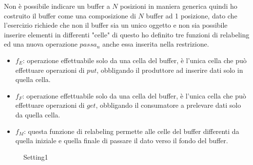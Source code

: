 \documentclass[a4paper]{article}
\begin{document}
Non è possibile indicare un buffer a $N$ posizioni in maniera generica quindi ho costruito il buffer come una composizione di $N$ buffer ad 1 posizione, dato che l'esercizio richiede che non il buffer sia un unico oggetto e non sia possibile inserire elementi in differenti "celle" di questo ho definito tre funzioni di relabeling ed una nuova operazione $passa_n$ anche essa inserita nella restrizione.
\begin{itemize}
	\item $f_E$: operazione effettuabile solo da una cella del buffer, è l'unica cella che può effettuare operazioni di $put$, obbligando il produttore ad inserire dati solo in quella cella.
	\item $f_F$: operazione effettuabile solo da una cella del buffer, è l'unica cella che può effettuare operazioni di $get$, obbligando il consumatore a prelevare dati solo da quella cella.
	\item $f_M$: questa funzione di relabeling permette alle celle del buffer differenti da quella iniziale e quella finale di passare il dato verso il fondo del buffer.
\end{itemize}
\begin{figure}[!ht]
\centering
{}
\caption{Setting1} \label{FIG:PA1_DG}
\end{figure}
\end{document}
